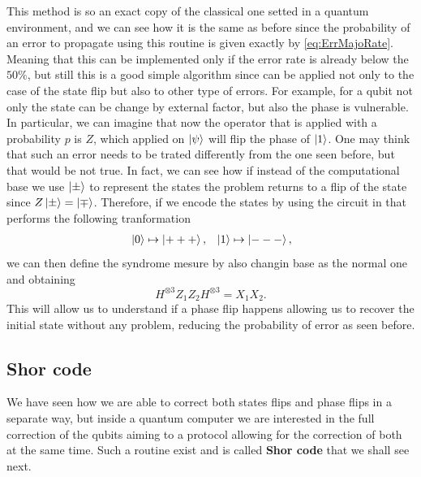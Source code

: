 This method is so an exact copy of the classical one setted in a quantum environment, and we can see how it is the same as before since the probability of an error to propagate using this routine is given exactly by \eqref{eq:ErrMajoRate}. Meaning that this can be implemented only if the error rate is already below the $50\%$, but still this is a good simple algorithm since can be applied not only to the case of the state flip but also to other type of errors. For example, for a qubit not only the state can be change by external factor, but also the phase is vulnerable. In particular, we can imagine that now the operator that is applied with a probability $p$ is $Z$, which applied on $\ket{\psi}$ will flip the phase of $\ket{1}$. One may think that such an error needs to be trated differently from the one seen before, but that would be not true. In fact, we can see how if instead of the computational base we use $\ket{\pm}$ to represent the states the problem returns to a flip of the state since $Z\ket{\pm} = \ket{\mp}$. Therefore, if we encode the states by using the circuit in  that performs the following tranformation
\begin{align}
    &\ket{0}\mapsto \ket{+++}, &\ket{1}\mapsto\ket{---},
\end{align}
we can then define the syndrome mesure by also changin base as the normal one and obtaining
\begin{equation}
    H^{\otimes 3} Z_1Z_2 H^{\otimes 3} = X_1X_2. 
\end{equation}
This will allow us to understand if a phase flip happens allowing us to recover the initial state without any problem, reducing the probability of error as seen before.

\subsection{Shor code}

We have seen how we are able to correct both states flips and phase flips in a separate way, but inside a quantum computer we are interested in the full correction of the qubits aiming to a protocol allowing for the correction of both at the same time. Such a routine exist and is called \textbf{Shor code} that we shall see next.

